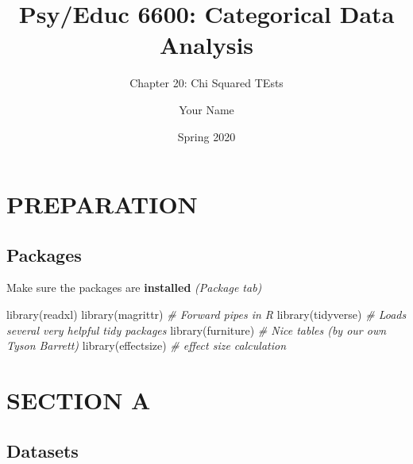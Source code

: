 \documentclass[
]{article}
\title{Psy/Educ 6600: Categorical Data Analysis}
\subtitle{Chapter 20: Chi Squared TEsts}
\author{Your Name}
\date{Spring 2020}
\newenvironment{Shaded}{\begin{snugshade}}{\end{snugshade}}
\newcommand{\CommentTok}[1]{\textcolor[rgb]{0.56,0.35,0.01}{\textit{#1}}}
\newcommand{\FunctionTok}[1]{\textcolor[rgb]{0.00,0.00,0.00}{#1}}
\newcommand{\NormalTok}[1]{#1}
\begin{document}
\maketitle

{
\setcounter{tocdepth}{3}
\tableofcontents
}
\clearpage

\listoftables
\listoffigures

\clearpage

\hypertarget{preparation}{%
\section{PREPARATION}\label{preparation}}

\hypertarget{packages}{%
\subsection{Packages}\label{packages}}

Make sure the packages are \textbf{installed} \emph{(Package tab)}

\begin{Shaded}
\begin{Highlighting}[]
\FunctionTok{library}\NormalTok{(readxl)}
\FunctionTok{library}\NormalTok{(magrittr)     }\CommentTok{\# Forward pipes in R}
\FunctionTok{library}\NormalTok{(tidyverse)    }\CommentTok{\# Loads several very helpful \textquotesingle{}tidy\textquotesingle{} packages}
\FunctionTok{library}\NormalTok{(furniture)    }\CommentTok{\# Nice tables (by our own Tyson Barrett)}
\FunctionTok{library}\NormalTok{(effectsize)   }\CommentTok{\# effect size calculation}
\end{Highlighting}
\end{Shaded}

\clearpage

\hypertarget{section-a}{%
\section{SECTION A}\label{section-a}}

\hypertarget{datasets}{%
\subsection{Datasets}\label{datasets}}
\end{document}
